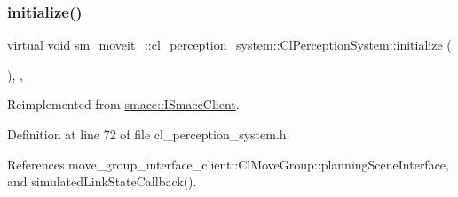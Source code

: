 \subsubsection{\texorpdfstring{initialize()}{initialize()}}
{\footnotesize\ttfamily virtual void sm\+\_\+moveit\+\_\+::cl\+\_\+perception\+\_\+system\+::\+Cl\+Perception\+System\+::initialize (\begin{DoxyParamCaption}{ }\end{DoxyParamCaption})\hspace{0.3cm}{\ttfamily [inline]}, {\ttfamily [override]}, {\ttfamily [virtual]}}



Reimplemented from \hyperlink{classsmacc_1_1ISmaccClient_a974ebb6ad6cf812e7b9de6b78b3d901f}{smacc\+::\+I\+Smacc\+Client}.



Definition at line 72 of file cl\+\_\+perception\+\_\+system.\+h.



References move\+\_\+group\+\_\+interface\+\_\+client\+::\+Cl\+Move\+Group\+::planning\+Scene\+Interface, and simulated\+Link\+State\+Callback().


